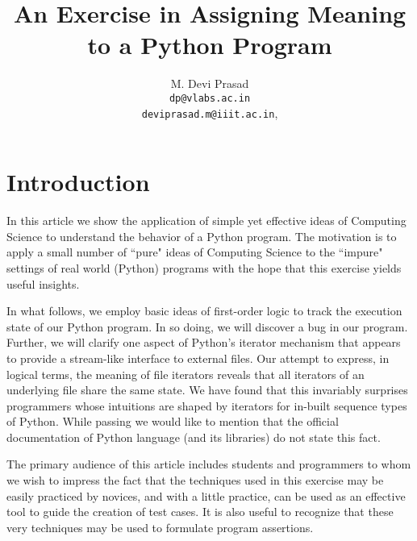 \documentclass[10pt, a4paper]{article}
\begin{document}
\title{An Exercise in Assigning Meaning to a Python Program}
\author{M. Devi Prasad\vspace*{1.5mm}\\\texttt{dp@vlabs.ac.in}\\\texttt{deviprasad.m@iiit.ac.in},}
\date{}
\maketitle


\section{Introduction}
In this article we show the application of simple yet effective ideas of Computing Science to understand the behavior of a Python program. The motivation is to apply a small number of ``pure" ideas of Computing Science to the ``impure" settings of real world (Python) programs with the hope that this exercise yields useful insights.

In what follows, we employ basic ideas of first-order logic to track the execution state of our Python program. In so doing, we will discover a bug in our program. Further, we will clarify one aspect of Python's iterator mechanism that appears to provide a stream-like interface to external files. Our attempt to express, in logical terms, the meaning of file iterators reveals that all iterators of an underlying file share the same state. We have found that this invariably surprises programmers whose intuitions are shaped by iterators for in-built sequence types of Python. While passing we would like to mention that the official documentation of Python language (and its libraries) do not state this fact.

The primary audience of this article includes students and programmers to whom we wish to impress the fact that the techniques used in this exercise may be easily practiced by novices, and with a little practice, can be used as an effective tool to guide the creation of test cases. It is also useful to recognize that these very techniques may be used to formulate program assertions.  

\end{document}
